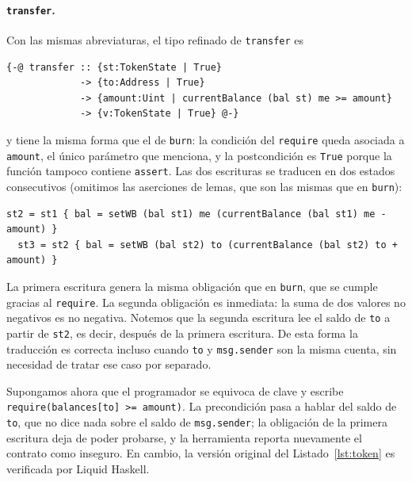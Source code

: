 \paragraph{\lstinline|transfer|.} Con las mismas abreviaturas, el tipo refinado de
\lstinline|transfer| es

\begin{lstlisting}[language=LHaskell]
{-@ transfer :: {st:TokenState | True}
             -> {to:Address | True}
             -> {amount:Uint | currentBalance (bal st) me >= amount}
             -> {v:TokenState | True} @-}
\end{lstlisting}

\noindent y tiene la misma forma que el de \lstinline|burn|: la condición del
\lstinline|require| queda asociada a \lstinline|amount|, el único parámetro que
menciona, y la postcondición es \lstinline|True| porque la función tampoco contiene
\lstinline|assert|. Las dos escrituras se traducen en dos estados consecutivos
(omitimos las aserciones de lemas, que son las mismas que en \lstinline|burn|):

\begin{lstlisting}[language=LHaskell]
  st2 = st1 { bal = setWB (bal st1) me (currentBalance (bal st1) me - amount) }
  st3 = st2 { bal = setWB (bal st2) to (currentBalance (bal st2) to + amount) }
\end{lstlisting}

La primera escritura genera la misma obligación que en \lstinline|burn|, que se
cumple gracias al \lstinline|require|. La segunda obligación es inmediata: la suma de
dos valores no negativos es no negativa. Notemos que la segunda escritura lee el
saldo de \lstinline|to| a partir de \lstinline|st2|, es decir, después de la primera
escritura. De esta forma la traducción es correcta incluso cuando \lstinline|to| y
\lstinline|msg.sender| son la misma cuenta, sin necesidad de tratar ese caso por
separado.

Supongamos ahora que el programador se equivoca de clave y escribe
\lstinline|require(balances[to] >= amount)|. La precondición pasa a hablar del saldo de
\lstinline|to|, que no dice nada sobre el saldo de \lstinline|msg.sender|; la
obligación de la primera escritura deja de poder probarse, y la herramienta reporta
nuevamente el contrato como inseguro. En cambio, la versión original del
Listado~\ref{lst:token} es verificada por Liquid Haskell.

